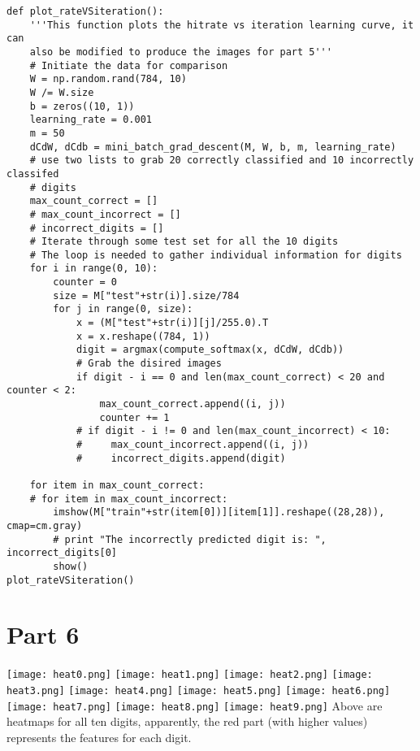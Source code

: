 \documentclass{article}
\begin{document}
\begin{lstlisting}
def plot_rateVSiteration():
    '''This function plots the hitrate vs iteration learning curve, it can 
    also be modified to produce the images for part 5'''
    # Initiate the data for comparison
    W = np.random.rand(784, 10)
    W /= W.size
    b = zeros((10, 1))
    learning_rate = 0.001
    m = 50
    dCdW, dCdb = mini_batch_grad_descent(M, W, b, m, learning_rate)
    # use two lists to grab 20 correctly classified and 10 incorrectly classifed
    # digits
    max_count_correct = []
    # max_count_incorrect = []
    # incorrect_digits = []
    # Iterate through some test set for all the 10 digits
    # The loop is needed to gather individual information for digits
    for i in range(0, 10):
        counter = 0
        size = M["test"+str(i)].size/784
        for j in range(0, size):
            x = (M["test"+str(i)][j]/255.0).T
            x = x.reshape((784, 1))
            digit = argmax(compute_softmax(x, dCdW, dCdb))
            # Grab the disired images
            if digit - i == 0 and len(max_count_correct) < 20 and counter < 2:
                max_count_correct.append((i, j))
                counter += 1
            # if digit - i != 0 and len(max_count_incorrect) < 10:
            #     max_count_incorrect.append((i, j))
            #     incorrect_digits.append(digit)

    for item in max_count_correct:
    # for item in max_count_incorrect:
        imshow(M["train"+str(item[0])][item[1]].reshape((28,28)), cmap=cm.gray)
        # print "The incorrectly predicted digit is: ", incorrect_digits[0]
        show()
plot_rateVSiteration()
\end{lstlisting}
\section*{Part 6}
\texttt{[image: heat0.png]}
\texttt{[image: heat1.png]}
\texttt{[image: heat2.png]}
\texttt{[image: heat3.png]}
\texttt{[image: heat4.png]}
\texttt{[image: heat5.png]}
\texttt{[image: heat6.png]}
\texttt{[image: heat7.png]}
\texttt{[image: heat8.png]}
\texttt{[image: heat9.png]}
\indent Above are heatmaps for all ten digits, apparently, the red part (with higher values) represents the features for each digit.\\
\end{document}
